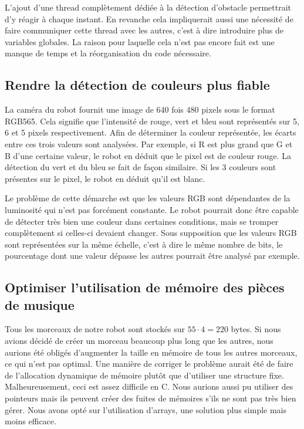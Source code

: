 \documentclass{article}
\begin{document}
    L'ajout d'une thread complètement dédiée à la détection d'obstacle permettrait d'y réagir à chaque instant.
    En revanche cela impliquerait aussi une nécessité de faire communiquer cette thread avec les autres, c'est à dire introduire plus de variables globales.
    La raison pour laquelle cela n'est pas encore fait est une manque de temps et la réorganisation du code nécessaire.

    \subsection{Rendre la détection de couleurs plus fiable}
    La caméra du robot fournit une image de 640 fois 480 pixels sous le format RGB565.
    Cela signifie que l'intensité de rouge, vert et bleu sont représentés sur 5, 6 et 5 pixels respectivement.
    Afin de déterminer la couleur représentée, les écarts entre ces trois valeurs sont analysées.
    Par exemple, si R est plus grand que G et B d'une certaine valeur, le robot en déduit que le pixel est de couleur rouge.
    La détection du vert et du bleu se fait de façon similaire.
    Si les 3 couleurs sont présentes sur le pixel, le robot en déduit qu'il est blanc.
    
    Le problème de cette démarche est que les valeurs RGB sont dépendantes de la luminosité qui n'est pas forcément constante.
    Le robot pourrait donc être capable de détecter très bien une couleur dans certaines conditions, mais se tromper complètement si celles-ci devaient changer.
    Sous supposition que les valeurs RGB sont représentées sur la même échelle, c'est à dire le même nombre de bits, le pourcentage dont une valeur dépasse les autres pourrait être analysé par exemple. 
    
    \subsection{Optimiser l'utilisation de mémoire des pièces de musique}
    Tous les morceaux de notre robot sont stockés sur $55 \cdot 4 = 220$ bytes. Si nous avions décidé de créer un morceau beaucoup plus long que les autres, nous aurions été obligés d'augmenter la taille en mémoire de tous les autres morceaux, ce qui n'est pas optimal. Une manière de corriger le problème aurait été de faire de l'allocation dynamique de mémoire plutôt que d'utiliser une structure fixe. Malheureusement, ceci est assez difficile en C. Nous aurions aussi pu utiliser des pointeurs mais ils peuvent créer des fuites de mémoires s'ils ne sont pas très bien gérer. Nous avons opté sur l'utilisation d'arrays, une solution plus simple mais moins efficace.
    
\end{document}
